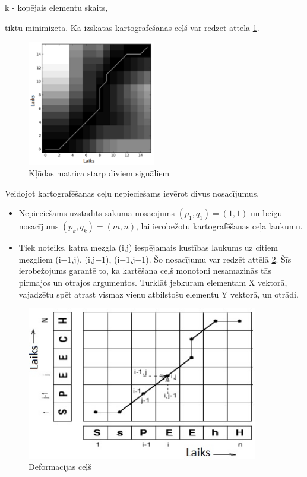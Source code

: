\documentclass[12pt,paper=A4]{report}
\begin{document}
k - kopējais elementu skaits,


 tiktu minimizēta. Kā izskatās kartografēšanas ceļš var redzēt attēlā \ref{cost-matrix}. 

\begin{figure}[H] \centering
\includegraphics[width=0.50\textwidth]{pathdtw} 
\caption{Kļūdas matrica starp diviem signāliem \cite{dtw1}}  \label{cost-matrix} 
\end{figure}

Veidojot kartografēšanas ceļu nepieciešams ievērot divus nosacījumus.

\begin{itemize}

\item Nepieciešams uzstādīts sākuma nosacījums $(p_1,q_1)=(1,1)$ un beigu nosacījums $(p_k,q_k)=(m,n)$, lai ierobežotu kartografēšanas ceļa laukumu.
\item Tiek noteiks, katra mezgla (i,j) iespējamais kustības laukums uz citiem mezgliem (i−1,j), (i,j−1), (i−1,j−1). Šo nosacījumu var redzēt attēlā \ref{road}. Šīs ierobežojums garantē to, ka kartēšana ceļš monotoni nesamazinās tās pirmajos un otrajos argumentos. Turklāt jebkuram elementam X vektorā, vajadzētu spēt atrast vismaz vienu atbilstošu elementu Y vektorā, un otrādi.

\end{itemize} 

\begin{figure}[h] \centering
\includegraphics[width=0.90\textwidth]{rules} 
\caption{Deformācijas ceļš \cite{dtw2}}  \label{road} 
\end{figure}
\end{document}
